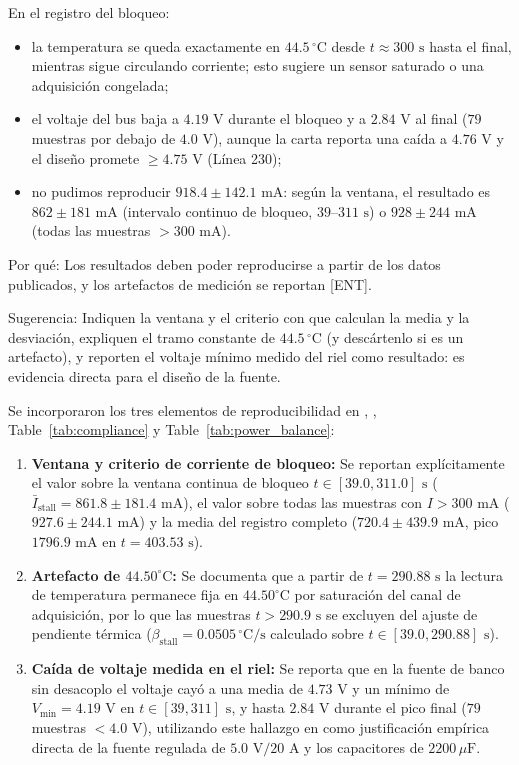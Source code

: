 \documentclass{LabDSTresponse}
\begin{document}
{En el registro del bloqueo:
\begin{itemize}
    \item la temperatura se queda exactamente en $44.5\,^\circ\text{C}$ desde $t \approx 300\text{ s}$ hasta el final, mientras sigue circulando corriente; esto sugiere un sensor saturado o una adquisición congelada;
    \item el voltaje del bus baja a $4.19\text{ V}$ durante el bloqueo y a $2.84\text{ V}$ al final ($79$ muestras por debajo de $4.0\text{ V}$), aunque la carta reporta una caída a $4.76\text{ V}$ y el diseño promete $\ge 4.75\text{ V}$ (Línea 230);
    \item no pudimos reproducir $918.4 \pm 142.1\text{ mA}$: según la ventana, el resultado es $862 \pm 181\text{ mA}$ (intervalo continuo de bloqueo, $39\text{--}311\text{ s}$) o $928 \pm 244\text{ mA}$ (todas las muestras $> 300\text{ mA}$).
\end{itemize}
Por qué: Los resultados deben poder reproducirse a partir de los datos publicados, y los artefactos de medición se reportan [ENT].

Sugerencia: Indiquen la ventana y el criterio con que calculan la media y la desviación, expliquen el tramo constante de $44.5\,^\circ\text{C}$ (y descártenlo si es un artefacto), y reporten el voltaje mínimo medido del riel como resultado: es evidencia directa para el diseño de la fuente.}
{Se incorporaron los tres elementos de reproducibilidad en , , Table~\ref{tab:compliance} y Table~\ref{tab:power_balance}:
\begin{enumerate}
    \item \textbf{Ventana y criterio de corriente de bloqueo:} Se reportan explícitamente el valor sobre la ventana continua de bloqueo $t \in [39.0, 311.0]\text{ s}$ ($\bar{I}_{\text{stall}} = 861.8 \pm 181.4\text{ mA}$), el valor sobre todas las muestras con $I > 300\text{ mA}$ ($927.6 \pm 244.1\text{ mA}$) y la media del registro completo ($720.4 \pm 439.9\text{ mA}$, pico $1796.9\text{ mA}$ en $t = 403.53\text{ s}$).
    \item \textbf{Artefacto de $44.50^\circ\text{C}$:} Se documenta que a partir de $t = 290.88\text{ s}$ la lectura de temperatura permanece fija en $44.50^\circ\text{C}$ por saturación del canal de adquisición, por lo que las muestras $t > 290.9\text{ s}$ se excluyen del ajuste de pendiente térmica ($\beta_{\text{stall}} = 0.0505\,^\circ\text{C/s}$ calculado sobre $t \in [39.0, 290.88]\text{ s}$).
    \item \textbf{Caída de voltaje medida en el riel:} Se reporta que en la fuente de banco sin desacoplo el voltaje cayó a una media de $4.73\text{ V}$ y un mínimo de $V_{\min} = 4.19\text{ V}$ en $t \in [39, 311]\text{ s}$, y hasta $2.84\text{ V}$ durante el pico final ($79$ muestras $< 4.0\text{ V}$), utilizando este hallazgo en  como justificación empírica directa de la fuente regulada de $5.0\text{ V} / 20\text{ A}$ y los capacitores de $2200\,\mu\text{F}$.
\end{enumerate}}
\end{document}
